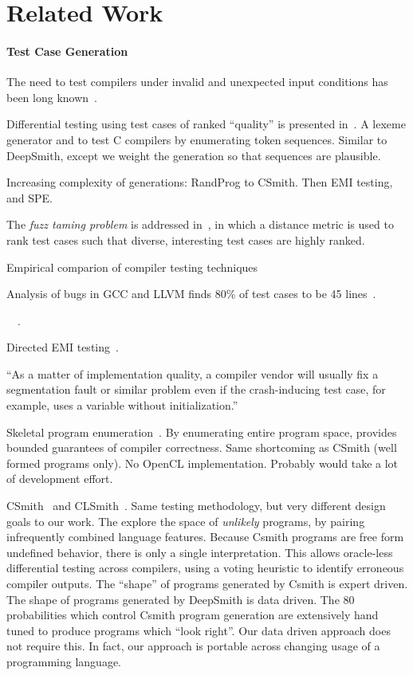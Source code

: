 \section{Related Work}\label{sec:rw}

\paragraph{Test Case Generation}

The need to test compilers under invalid and unexpected input conditions has been long known~\cite{Boujarwah1997}.

Differential testing using test cases of ranked ``quality'' is presented in~\cite{McKeeman1998}. A lexeme generator and to test C compilers by enumerating token sequences. Similar to DeepSmith, except we weight the generation so that sequences are plausible.

Increasing complexity of generations: RandProg to CSmith. Then EMI testing, and SPE.

The \emph{fuzz taming problem} is addressed in~\cite{Chen2013}, in which a distance metric is used to rank test cases such that diverse, interesting test cases are highly ranked.

Empirical comparion of compiler testing techniques~\cite{Chen2014a}

Analysis of bugs in GCC and LLVM finds 80\% of test cases to be 45 lines~\cite{Sun2016}.

~\cite{Godefroid2008a,Le2015,Sun2016a}~\cite{Kossatchev2005}.

 Directed EMI testing~\cite{Le2015}.

``As a matter of implementation quality, a compiler vendor will usually fix a segmentation fault or similar problem even if the crash-inducing test case, for example, uses a variable without initialization.''~\cite{Regehr2012a}

Skeletal program enumeration~\cite{Zhang2016a}. By enumerating entire program space, provides bounded guarantees of compiler correctness. Same shortcoming as CSmith (well formed programs only). No OpenCL implementation. Probably would take a lot of development effort. 

CSmith~\cite{Yang2011} and CLSmith~\cite{Lidbury2015a}. Same testing methodology, but very different design goals to our work. The explore the space of \emph{unlikely} programs, by pairing infrequently combined language features. Because Csmith programs are free form undefined behavior, there is only a single interpretation. This allows oracle-less differential testing across compilers, using a voting heuristic to identify erroneous compiler outputs. The ``shape'' of programs generated by Csmith is expert driven. The shape of programs generated by DeepSmith is data driven. The 80 probabilities which control Csmith program generation are extensively hand tuned to produce programs which ``look right''. Our data driven approach does not require this. In fact, our approach is portable across changing usage of a programming language.

